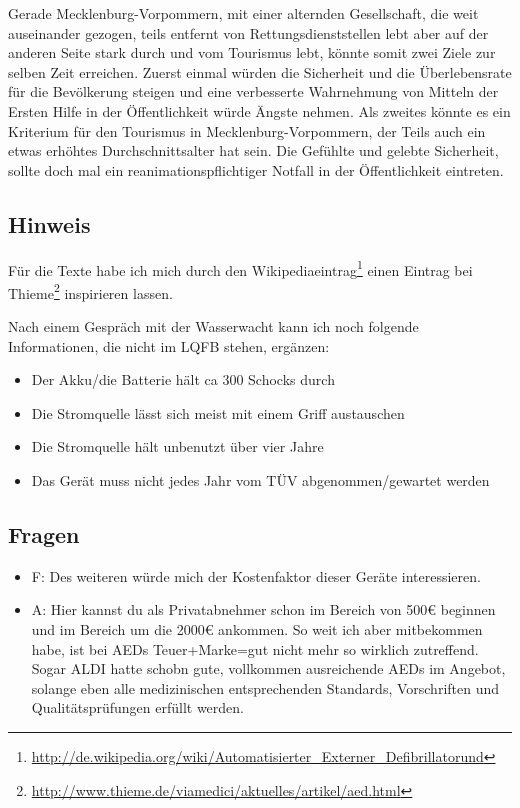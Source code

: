 Gerade Mecklenburg-Vorpommern, mit einer alternden Gesellschaft, die weit auseinander gezogen, teils entfernt von Rettungsdienststellen lebt aber auf der anderen Seite stark durch und vom Tourismus lebt, könnte somit zwei Ziele zur selben Zeit erreichen. Zuerst einmal würden die Sicherheit und die Überlebensrate für die Bevölkerung steigen und eine verbesserte Wahrnehmung von Mitteln der Ersten Hilfe in der Öffentlichkeit würde Ängste nehmen. Als zweites könnte es ein Kriterium für den Tourismus in Mecklenburg-Vorpommern, der Teils auch ein etwas erhöhtes Durchschnittsalter hat sein. Die Gefühlte und gelebte Sicherheit, sollte doch mal ein reanimationspflichtiger Notfall in der Öffentlichkeit eintreten.

\subsection{Hinweis}

Für die Texte habe ich mich durch den Wikipediaeintrag\footnote{\url{http://de.wikipedia.org/wiki/Automatisierter\_Externer\_Defibrillatorund}} einen Eintrag bei Thieme\footnote{\url{http://www.thieme.de/viamedici/aktuelles/artikel/aed.html}} inspirieren lassen.

Nach einem Gespräch mit der Wasserwacht kann ich noch folgende Informationen, die nicht im LQFB stehen, ergänzen:

\begin{itemize}
\item
  Der Akku/die Batterie hält ca 300 Schocks durch
\item
  Die Stromquelle lässt sich meist mit einem Griff austauschen
\item
  Die Stromquelle hält unbenutzt über vier Jahre
\item
  Das Gerät muss nicht jedes Jahr vom TÜV abgenommen/gewartet werden
\end{itemize}
\subsection{Fragen}

\begin{itemize}
\item
  F: Des weiteren würde mich der Kostenfaktor dieser Geräte interessieren.
\item
  A: Hier kannst du als Privatabnehmer schon im Bereich von 500€ beginnen und im Bereich um die 2000€ ankommen. So weit ich aber mitbekommen habe, ist bei AEDs Teuer+Marke=gut nicht mehr so wirklich zutreffend. Sogar ALDI hatte schobn gute, vollkommen ausreichende AEDs im Angebot, solange eben alle medizinischen entsprechenden Standards, Vorschriften und Qualitätsprüfungen erfüllt werden.
\end{itemize}

